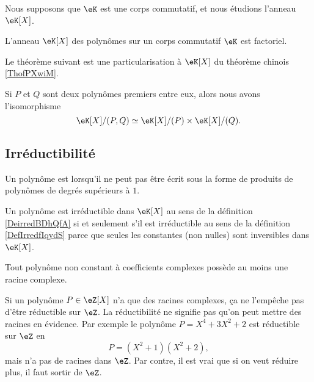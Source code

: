Nous supposons que \( \eK\) est une corps commutatif, et nous étudions l'anneau \( \eK[X]\). 

\begin{proposition}     \label{PropqGZXvr}
    L'anneau \( \eK[X]\) des polynômes sur un corps commutatif \( \eK\) est factoriel.
\end{proposition}

Le théorème suivant est une particularisation à \( \eK[X]\) du théorème chinois \ref{ThofPXwiM}.
\begin{theorem}
    Si \( P\) et \( Q\) sont deux polynômes premiers entre eux, alors nous avons l'isomorphisme
    \begin{equation}
        \eK[X]/(P,Q)\simeq\eK[X]/(P)\times \eK[X]/(Q).
    \end{equation}
\end{theorem}

\subsection{Irréductibilité}

\begin{definition}      \label{DefIrredfIqydS}
    Un polynôme est  lorsqu'il ne peut pas être écrit sous la forme de produits de polynômes de degrés supérieurs à \( 1\).
\end{definition}

    Un polynôme est irréductible dans \( \eK[X]\) au sens de la définition \ref{DeirredBDhQfA} si et seulement s'il est irréductible au sens de la définition \ref{DefIrredfIqydS} parce que seules les constantes (non nulles) sont inversibles dans \( \eK[X]\).

\begin{theorem}      \label{ThovgyUuA}
    Tout polynôme non constant à coefficients complexes possède au moins une racine complexe.
\end{theorem}

\begin{example}
    Si un polynôme \( P\in \eZ[X]\) n'a que des racines complexes, ça ne l'empêche pas d'être réductible sur \( \eZ\). La réductibilité ne signifie pas qu'on peut mettre des racines en évidence. Par exemple le polynôme \( P=X^4+3X^2+2\) est réductible sur \( \eZ\) en
    \begin{equation}
        P=(X^2+1)(X^2+2),
    \end{equation}
    mais n'a pas de racines dans \( \eZ\). Par contre, il est vrai que si on veut réduire plus, il faut sortir de \( \eZ\).

\end{example}

